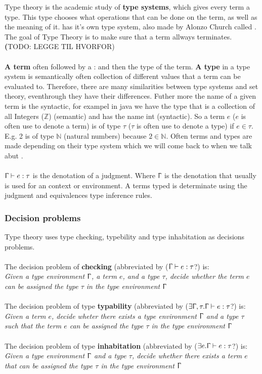Type theory is the academic study of \textbf{type systems}, 
which gives every term a type. This type chooses what operations 
that can be done on the term, as well as the meaning of it. 
 has it's own type system, also made 
by Alonzo Church called .
The goal of Type Theory is to make sure that a term allways terminates.
\textbf(TODO: LEGGE TIL HVORFOR) \\ \\
\textbf{A term} often followed by a : and then the type of the term.
\textbf{A type} in a type system is semantically often collection of different
values that a term can be evaluated to. Therefore, there are many 
similarities between type systems and set theory, eventhrough they 
have their differences. Futher more the name of a given term is the syntactic, 
for exampel in java we have the type that  is a collection of all Integers ($\mathbb{Z}$) (semantic) 
and has the name int (syntactic).
So a term $e$ ($e$ is often use to denote a term) is of type 
$\tau$ ($\tau$ is often use to denote a type) if $e \in \tau$. 
E.g. 2 is of type $\mathbb{N}$ (natural numbers) because 
$2 \in \mathbb{N}$. Often terms and types are made depending on their 
type system which we will come back to when we talk abut 
. \\ \\
$\Upgamma \vdash e:\tau$ is the denotation of a judgment. 
Where $\Upgamma$ is the denotation that usually is used for an 
context or environment. A terms typed is determinate using the 
judgment and equivalences type inference rules.

\subsubsection{Decision problems}

Type theory uses type checking, typebility and type inhabitation as decisions problems. \\ \\
The decision problem of \textbf{checking} (abbreviated by ($\Upgamma\vdash e : \tau$?) is:\\
\textit{Given a type environment $\Upgamma$, a term $e$, and a type $\tau$, decide whether the term $e$ can be assigned the type $\tau$ in the type environment $\Upgamma$} \\ \\
The decision problem of type \textbf{typability} (abbreviated by ($ \exists \Upgamma,\tau .\Upgamma\vdash e : \tau$?) is: \\ 
\textit{Given  a term $e$, decide wheter there exists a type environment $\Upgamma$ and a type $\tau$ such that the term $e$ can be assigned the type $\tau$ in the type environment $\Upgamma$} \\ \\ 
The decision problem of type \textbf{inhabitation} (abbreviated by ($ \exists e.\Upgamma \vdash e : \tau$?) is: \\
\textit{Given a type environment $\Upgamma$ and a type $\tau$, decide whether there exists a term $e$ that can be assigned the type $\tau$ in the type environment $\Upgamma$}

